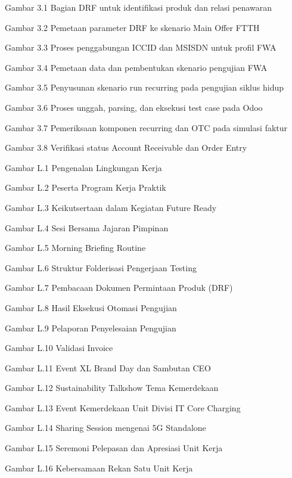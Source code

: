 \documentclass[12pt,a4paper]{article}
\begin{document}
\begin{singlespace}
\noindent Gambar 3.1 Bagian DRF untuk identifikasi produk dan relasi penawaran \par
\noindent Gambar 3.2 Pemetaan parameter DRF ke skenario Main Offer FTTH \par
\noindent Gambar 3.3 Proses penggabungan ICCID dan MSISDN untuk profil FWA \par
\noindent Gambar 3.4 Pemetaan data dan pembentukan skenario pengujian FWA \par
\noindent Gambar 3.5 Penyusunan skenario run recurring pada pengujian siklus hidup \par
\noindent Gambar 3.6 Proses unggah, parsing, dan eksekusi test case pada Odoo \par
\noindent Gambar 3.7 Pemeriksaan komponen recurring dan OTC pada simulasi faktur \par
\noindent Gambar 3.8 Verifikasi status Account Receivable dan Order Entry \par
\vspace{0.15cm}
\noindent Gambar L.1 Pengenalan Lingkungan Kerja \par
\noindent Gambar L.2 Peserta Program Kerja Praktik \par
\noindent Gambar L.3 Keikutsertaan dalam Kegiatan Future Ready \par
\noindent Gambar L.4 Sesi Bersama Jajaran Pimpinan \par
\noindent Gambar L.5 Morning Briefing Routine \par
\noindent Gambar L.6 Struktur Folderisasi Pengerjaan Testing \par
\noindent Gambar L.7 Pembacaan Dokumen Permintaan Produk (DRF) \par
\noindent Gambar L.8 Hasil Eksekusi Otomasi Pengujian \par
\noindent Gambar L.9 Pelaporan Penyelesaian Pengujian \par
\noindent Gambar L.10 Validasi Invoice \par
\noindent Gambar L.11 Event XL Brand Day dan Sambutan CEO \par
\noindent Gambar L.12 Sustainability Talkshow Tema Kemerdekaan \par
\noindent Gambar L.13 Event Kemerdekaan Unit Divisi IT Core Charging \par
\noindent Gambar L.14 Sharing Session mengenai 5G Standalone \par
\noindent Gambar L.15 Seremoni Pelepasan dan Apresiasi Unit Kerja \par
\noindent Gambar L.16 Kebersamaan Rekan Satu Unit Kerja \par
\end{singlespace}
\end{document}
